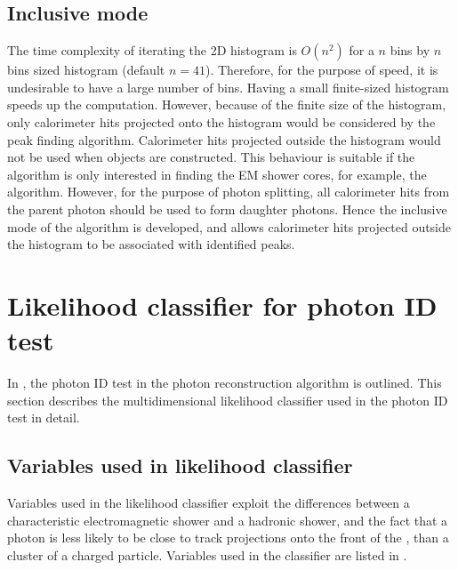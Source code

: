 \subsection{Inclusive mode}
\label{sec:photonPeakFindingInclusive}


The time complexity of iterating the 2D histogram is $O(n^2)$ for a $n$ bins by  $n$ bins sized histogram (default $n = 41$). Therefore, for the purpose of speed, it is undesirable to have  a large number of bins. Having a small finite-sized histogram speeds up the computation. However, because of the finite size of the histogram, only  calorimeter hits  projected onto the histogram would be considered by the peak finding algorithm. Calorimeter hits projected outside the histogram would not be used when \ShowerPeak objects are constructed. This behaviour is suitable if the algorithm is only interested in finding the EM shower cores, for example, the \PhotonReconstruction algorithm. However, for the purpose of photon splitting, all calorimeter hits from the parent photon should be used to form daughter photons. Hence the inclusive mode of the \peakFinding algorithm is developed, and allows calorimeter hits projected outside the histogram to be associated with identified peaks.


\section{Likelihood classifier for photon ID test}
\label{sec:photonLikelihood}

In , the photon ID test in the photon reconstruction algorithm is outlined. This section describes the multidimensional likelihood classifier used in the photon ID test in detail.


\subsection{Variables used in likelihood classifier }

Variables used in the likelihood classifier exploit the differences between a characteristic electromagnetic shower and a hadronic shower, and the fact that a photon is less likely to be close to track projections onto the front of the \ECAL, than a cluster of a charged particle. Variables used in the classifier are listed in .

